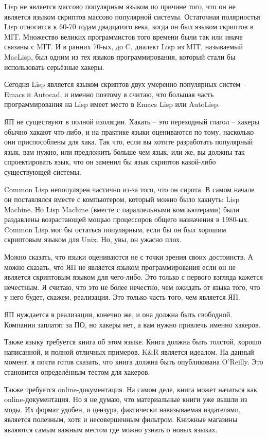 \documentclass[ebook,12pt,oneside,openany]{memoir}
\begin{document}
Lisp не является массово популярным языком по причине того, что он не
является языком скриптов массово популярной системы. Остаточная
полярностья Lisp относится к 60-70 годам двадцатого века, когда он был
языком скриптов в MIT. Множество великих программистов того времени
были так или иначе связаны с MIT. И в ранних 70-ых, до C, диалект Lisp
из MIT, называемый MacLisp, был одним из тех языков программирования,
который стали бы использовать серьёзные хакеры.

Сегодня Lisp является языком скриптов двух умеренно популярных систем
-- Emacs и Autocad, и именно поэтому я считаю, что большая часть
программирования на Lisp имеет место в Emacs Lisp или AutoLisp.

ЯП не существуют в полной изоляции. Хакать -- это переходный глагол --
хакеры обычно хакают что-либо, и на практике языки оцениваются по
тому, насколько они приспособлены для хака. Так что, если вы хотите
разработать популярный язык, вам нужно, или предложить больше чем
язык, или же, вы должны так спроектировать язык, что он заменил бы
язык скриптов какой-либо существующей системы.

Common Lisp непопулярен частично из-за того, что он сирота. В самом
начале он поставлялся вместе с компьютером, который можно было
хакнуть: Lisp Machine. Но Lisp Machine (вместе с параллельными
компьютерами) были раздавлены возрастающей мощью процессоров общего
назначения в 1980-ых. Common Lisp мог бы остаться популярным, если бы
он был хорошим скриптовым языком для Unix. Но, увы, он ужасно плох.

Можно сказать, что языки оцениваются не с точки зрения своих
достоинств. А можно сказать, что ЯП не является языком
программирования если он не является скриптовым языком для чего-либо.
Это только с первого взгляда кажется нечестным. Я считаю, что это не
более нечестно, чем ожидать от языка того, что у него будет, скажем,
реализация. Это только часть того, чем является ЯП.

ЯП нуждается в реализации, конечно же, и она должна быть свободной.
Компании заплатят за ПО, но хакеры нет, а вам нужно привлечь именно
хакеров.

Также языку требуется книга об этом языке. Книга должна быть толстой,
хорошо написанной, и полной отличных примеров. K\&R является идеалом.
На данный момент, я почти готов сказать, что книга должна быть
опубликована O'Reilly. Это становится определённым тестом для хакеров.

Также требуется online-документация. На самом деле, книга может
начаться как online-документация. Но я не думаю, что материальные
книги уже вышли из моды. Их формат удобен, и цензура, фактически
навязываемая издателями, является полезным, хотя и несовершенным
фильтром. Книжные магазины являются самым важным местом где можно
узнать о новых языках.
\end{document}

